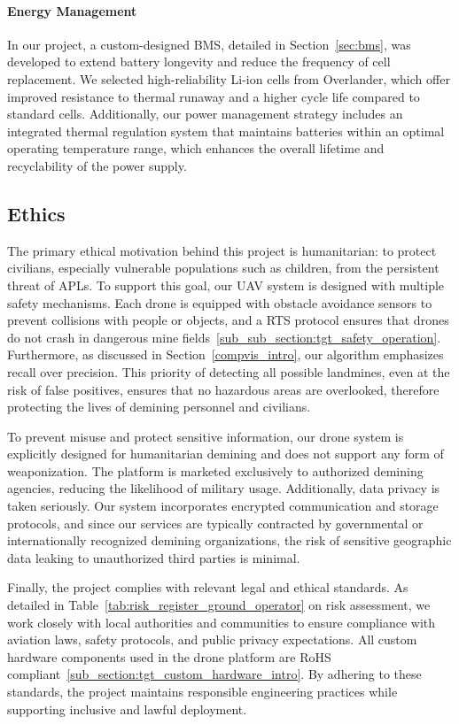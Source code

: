 \paragraph{Energy Management}

In our project, a custom-designed \gls{BMS}, detailed in Section~\ref{sec:bms}, was developed to extend battery longevity and reduce the frequency of cell replacement. We selected high-reliability \gls{Li-ion} cells from Overlander, which offer improved resistance to thermal runaway and a higher cycle life compared to standard cells. Additionally, our power management strategy includes an integrated thermal regulation system that maintains batteries within an optimal operating temperature range, which enhances the overall lifetime and recyclability of the power supply.


\subsection{Ethics}\label{ethics}

The primary ethical motivation behind this project is humanitarian: to protect civilians, especially vulnerable populations such as children, from the persistent threat of \gls{APL}s. To support this goal, our \gls{UAV} system is designed with multiple safety mechanisms. Each drone is equipped with obstacle avoidance sensors to prevent collisions with people or objects, and a \gls{RTS} protocol ensures that drones do not crash in dangerous mine fields~\ref{sub_sub_section:tgt_safety_operation}. Furthermore, as discussed in Section~\ref{compvis_intro}, our algorithm emphasizes recall over precision. This priority of detecting all possible landmines, even at the risk of false positives, ensures that no hazardous areas are overlooked, therefore protecting the lives of demining personnel and civilians.

To prevent misuse and protect sensitive information, our drone system is explicitly designed for humanitarian demining and does not support any form of weaponization. The platform is marketed exclusively to authorized demining agencies, reducing the likelihood of military usage. Additionally, data privacy is taken seriously. Our system incorporates encrypted communication and storage protocols, and since our services are typically contracted by governmental or internationally recognized demining organizations, the risk of sensitive geographic data leaking to unauthorized third parties is minimal.

Finally, the project complies with relevant legal and ethical standards. As detailed in Table~\ref{tab:risk_register_ground_operator} on risk assessment, we work closely with local authorities and communities to ensure compliance with aviation laws, safety protocols, and public privacy expectations. All custom hardware components used in the drone platform are \gls{RoHS} compliant~\ref{sub_section:tgt_custom_hardware_intro}. By adhering to these standards, the project maintains responsible engineering practices while supporting inclusive and lawful deployment.